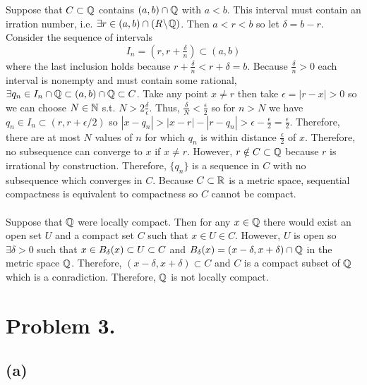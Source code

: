 \documentclass[12pt]{extarticle}
\begin{document}
Suppose that $C \subset \mathbb{Q}$ contains $(a, b) \cap \mathbb{Q}$ with $a < b$. This interval must contain an irration number, i.e. $ \exists r \in (a, b) \cap (R \! \setminus \! \mathbb{Q})$. Then $a < r < b$ so let $\delta = b - r$. Consider the sequence of intervals 
\[I_n = (r, r + \tfrac{\delta}{n}) \subset (a, b)\] 
where the last inclusion holds because $r + \frac{\delta}{n} < r + \delta = b$. Because $ \tfrac{\delta}{n} > 0$ each interval is nonempty and must contain some rational, $\exists q_n \in I_n \cap \mathbb{Q} \subset (a, b) \cap \mathbb{Q} \subset C$. Take any point $x \neq r$ then take $\epsilon = |r - x| > 0$ so we can choose $N \in \mathbb{N}$ s.t. $N > 2 \frac{\delta}{\epsilon}$. Thus, $\frac{\delta}{N} < \frac{\epsilon}{2}$ so for $n > N$ we have $q_n \in I_n \subset (r, r + \epsilon/2)$ so $|x - q_n| > |x - r| - |r - q_n| > \epsilon - \frac{\epsilon}{2} = \frac{\epsilon}{2}$. Therefore, there are at most $N$ values of $n$ for which $q_n$ is within distance $\frac{\epsilon}{2}$ of $x$. Therefore, no subsequence can converge to $x$ if $x \neq r$. However, $r \notin C \subset \mathbb{Q}$ because $r$ is irrational by construction. Therefore, $\{q_n\}$ is a sequence in $C$ with no subsequence which converges in $C$. Because $C \subset \mathbb{R}$ is a metric space, sequential compactness is equivalent to compactness so $C$ cannot be compact. \\\\
Suppose that $\mathbb{Q}$ were locally compact. Then for any $x \in \mathbb{Q}$ there would exist an open set $U$ and a compact set $C$ such that $x \in U \in C$. However, $U$ is open so $\exists \delta > 0$ such that $x \in B_{\delta} \! \left(x \right) \subset U \subset C$ and $B_{\delta} \! \left(x \right) = (x - \delta, x + \delta) \cap \mathbb{Q}$ in the metric space $\mathbb{Q}$. Therefore, $(x - \delta, x + \delta) \subset C$ and $C$ is a compact subset of $\mathbb{Q}$ which is a conradiction. Therefore, $\mathbb{Q}$ is not locally compact. 

\section*{Problem 3.}
\subsection*{(a)}
\end{document}
